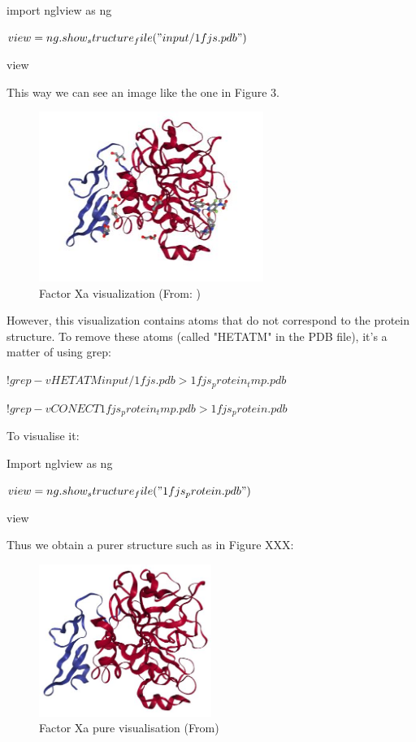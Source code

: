 \documentclass[11pt, letterpaper, english]{article}
\begin{document}
        \par{import nglview as ng}
        \par{$view = ng.show_structure_file("input/1fjs.pdb")$}
        \par{view}
        \\
        
        \par{This way we can see an image like the one in Figure 3.}
        \begin{figure}
	    \centering
		\caption{Factor Xa visualization (From: \cite{Villa_2017})}
		\includegraphics[width=0.65\textwidth]{Proteina.JPG}
	\end{figure}
	
\par{However, this visualization contains atoms that do not correspond to the protein structure. To remove these atoms (called "HETATM" in the PDB file), it's a matter of using grep:}

\vspace{0.5 cm}

\par{$!grep -v HETATM input/1fjs.pdb > 1fjs_protein_tmp.pdb$}
\par{$!grep -v CONECT 1fjs_protein_tmp.pdb > 1fjs_protein.pdb$}
\par{To visualise it:}
\par{Import nglview as ng}
\par{$view = ng.show_structure_file("1fjs_protein.pdb")$}
\par{view}
\\

\par{Thus we obtain a purer structure such as in Figure XXX:}

\begin{figure}
	    \centering
		\caption{Factor Xa pure visualisation (From\cite{Villa_2017})}
		\includegraphics[width=0.5\textwidth]{ProteinaPura.JPG}
	\end{figure}
\end{document}
